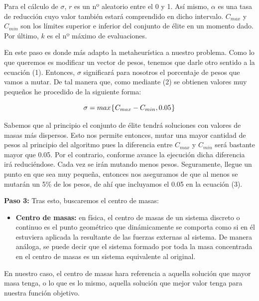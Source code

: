 \documentclass[10pt, a4paper]{article}
\theoremstyle{theorem-style}
\theoremstyle{theorem-style}
\theoremstyle{theorem2-style}
\theoremstyle{definition-style}
\theoremstyle{remark-style}
\theoremstyle{example-style}
\theoremstyle{definition-style}
\theoremstyle{remark-style}
\theoremstyle{remark-style}
\begin{document}
Para el cálculo de $\sigma$, $r$ es un nº aleatorio entre el 0 y 1. Así mismo, $\alpha$ es una tasa de reducción cuyo valor también estará comprendido en dicho intervalo. $C_{max}$ y $C_{min}$ son los límites superior e inferior del conjunto de élite en un momento dado. Por último, $k$ es el nº máximo de evaluaciones. 

En este paso es donde más adapto la metaheurística a nuestro problema. Como lo que queremos es modificar un vector de pesos, tenemos que darle otro sentido a la ecuación (1). Entonces, $\sigma$ significará para nosotros el porcentaje de pesos que vamos a mutar. De tal manera que, como mediante (2) se obtienen valores muy pequeños he procedido de la siguiente forma: 

\begin{equation}
\sigma = max\hspace{0.02cm}\{\hspace{0.02cm}C_{max} - C_{min}, 0.05\hspace{0.02cm}\}
\end{equation}

Sabemos que al principio el conjunto de élite tendrá soluciones con valores de masas más dispersos. Esto nos permite entonces, mutar una mayor cantidad de pesos al principio del algoritmo pues la diferencia entre $C_{max}$ y $C_{min}$ será bastante mayor que 0.05. Por el contrario, conforme avance la ejecución dicha diferencia irá reduciéndose. Cada vez se irán mutando menos pesos. Seguramente, llegue un punto en que sea muy pequeña, entonces nos aseguramos de que al menos se mutarán un 5\% de los pesos, de ahí que incluyamos el 0.05 en la ecuación (3). 

\textbf{Paso 3: }Tras esto, buscaremos el centro de masas: 

\begin{itemize}
\item \textbf{Centro de masas:} en física, el centro de masas de un sistema discreto o continuo es el punto geométrico que dinámicamente se comporta como si en él estuviera aplicada la resultante de las fuerzas externas al sistema. De manera análoga, se puede decir que el sistema formado por toda la masa concentrada en el centro de masas es un sistema equivalente al original.
\end{itemize}

En nuestro caso, el centro de masas hara referencia a aquella solución que mayor masa tenga, o lo que es lo mismo, aquella solución que mejor valor tenga para nuestra función objetivo. 
\end{document}
